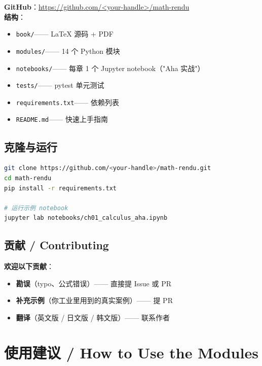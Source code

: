 \begin{tcolorbox}[essbox={本书代码仓库}]
\textbf{GitHub}：\url{https://github.com/<your-handle>/math-rendu}\\[4pt]
\textbf{结构}：
\begin{itemize}
\item \texttt{book/}\quad —— LaTeX 源码 + PDF
\item \texttt{modules/}\quad —— 14 个 Python 模块
\item \texttt{notebooks/}\quad —— 每章 1 个 Jupyter notebook（"Aha 实战"）
\item \texttt{tests/}\quad —— pytest 单元测试
\item \texttt{requirements.txt}\quad —— 依赖列表
\item \texttt{README.md}\quad —— 快速上手指南
\end{itemize}
\end{tcolorbox}

\subsection{克隆与运行}

\begin{lstlisting}[language=bash]
git clone https://github.com/<your-handle>/math-rendu.git
cd math-rendu
pip install -r requirements.txt

# 运行示例 notebook
jupyter lab notebooks/ch01_calculus_aha.ipynb
\end{lstlisting}

\subsection{贡献 / Contributing}

\textbf{欢迎以下贡献}：

\begin{itemize}
\item \textbf{勘误}（typo、公式错误）—— 直接提 Issue 或 PR
\item \textbf{补充示例}（你工业里用到的真实案例）—— 提 PR
\item \textbf{翻译}（英文版 / 日文版 / 韩文版）—— 联系作者
\end{itemize}

\section{使用建议 / How to Use the Modules}

